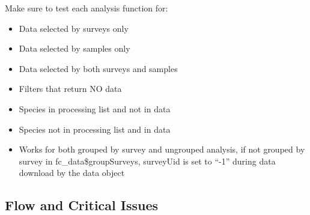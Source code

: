 \documentclass[
  letterpaper,
  DIV=11,
  numbers=noendperiod]{scrreprt}
\begin{document}
Make sure to test each analysis function for:

\begin{itemize}
\item
  Data selected by surveys only
\item
  Data selected by samples only
\item
  Data selected by both surveys and samples
\item
  Filters that return NO data
\item
  Species in processing list and not in data
\item
  Species not in processing list and in data
\item
  Works for both grouped by survey and ungrouped analysis, if not
  grouped by survey in fc\_data\$groupSurveys, surveyUid is set to
  ``-1'' during data download by the data object
\end{itemize}

\subsection{Flow and Critical Issues}\label{flow-and-critical-issues}
\end{document}
